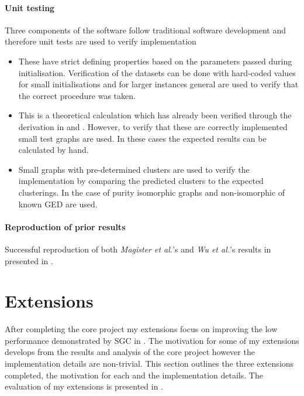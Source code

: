 \paragraph{Unit testing}
Three components of the software follow traditional software development and therefore unit tests are used to verify implementation
\begin{itemize}
    \item[] 
        These have strict defining properties based on the parameters passed during initialisation.
        Verification of the datasets can be done with hard-coded values for small initialisations and
        for larger instances general are
        used to verify that the correct procedure was taken.
    \item[] 
        This is a theoretical calculation which
        has already been verified through the derivation in  and .
        However, to verify that these are correctly implemented
        small test graphs are used.
        In these cases the expected results can be calculated by hand.
    \item[] 
        Small graphs with pre-determined clusters are used to verify the implementation by comparing the predicted clusters to the expected clusterings.
        In the case of purity isomorphic graphs and non-isomorphic of known GED are used.
\end{itemize}

\paragraph{Reproduction of prior results}
Successful reproduction of both \textit{Magister et al.}\cite{magister2021gcexplainer}'s and \textit{Wu et al.}\cite{wu2019simplifying}'s results in presented in .

\section{Extensions}
\label{sec:extensions-imp}
After completing the core project my extensions focus on improving the low performance demonstrated by SGC in .
The motivation for some of my extensions develops from the results and analysis of the core project however the implementation details are non-trivial.
This section outlines the three extensions completed, the motivation for each and the implementation details.
The evaluation of my extensions is presented in .


